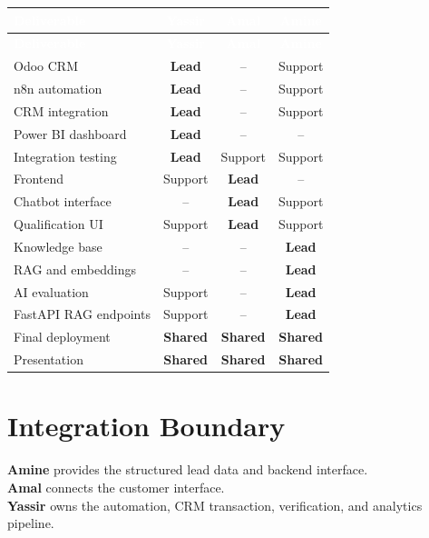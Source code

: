 \documentclass[11pt,a4paper]{article}
\newcommand{\rolelead}{\textcolor{LeadGreen}{\textbf{Lead}}}
\newcommand{\rolesupport}{\textcolor{LeadBlue}{Support}}
\newcommand{\roleshared}{\textcolor{LeadTeal}{\textbf{Shared}}}
\newcommand{\none}{\textcolor{LeadGray}{--}}
\begin{document}
\small
{}
\begin{longtable}{>{\raggedright\arraybackslash}p{5.5cm}ccc}
  \toprule
  \rowcolor{LeadBlue}
  \textcolor{white}{\textbf{Deliverable}} &
  \textcolor{white}{\textbf{Yassir}} &
  \textcolor{white}{\textbf{Amal}} &
  \textcolor{white}{\textbf{Amine}} \\
  \midrule
  \endfirsthead
  \toprule
  \rowcolor{LeadBlue}
  \textcolor{white}{\textbf{Deliverable}} &
  \textcolor{white}{\textbf{Yassir}} &
  \textcolor{white}{\textbf{Amal}} &
  \textcolor{white}{\textbf{Amine}} \\
  \midrule
  \endhead
  Odoo CRM              & \rolelead    & \none       & \rolesupport \\
  n8n automation        & \rolelead    & \none       & \rolesupport \\
  CRM integration       & \rolelead    & \none       & \rolesupport \\
  Power BI dashboard    & \rolelead    & \none       & \none \\
  Integration testing   & \rolelead    & \rolesupport & \rolesupport \\
  Frontend               & \rolesupport & \rolelead    & \none \\
  Chatbot interface      & \none        & \rolelead    & \rolesupport \\
  Qualification UI       & \rolesupport & \rolelead    & \rolesupport \\
  Knowledge base         & \none        & \none        & \rolelead \\
  RAG and embeddings     & \none        & \none        & \rolelead \\
  AI evaluation          & \rolesupport & \none        & \rolelead \\
  FastAPI RAG endpoints  & \rolesupport & \none        & \rolelead \\
  Final deployment       & \roleshared  & \roleshared  & \roleshared \\
  Presentation           & \roleshared  & \roleshared  & \roleshared \\
  \bottomrule
\end{longtable}
\normalsize

\section{Integration Boundary}

\begin{center}
\setlength{\fboxsep}{12pt}
\colorbox{LeadLight}{%
  \begin{minipage}{0.88\textwidth}
    \textbf{Amine} provides the structured lead data and backend interface.\\[0.45em]
    \textbf{Amal} connects the customer interface.\\[0.45em]
    \textbf{Yassir} owns the automation, CRM transaction, verification, and analytics pipeline.
  \end{minipage}%
}
\end{center}
\end{document}
